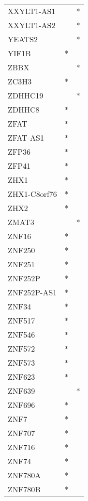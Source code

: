 \begin{longtable}{lcc}
XXYLT1-AS1       &                &          * \\
XXYLT1-AS2       &                &          * \\
YEATS2           &                &          * \\
YIF1B            &              * &            \\
ZBBX             &                &          * \\
ZC3H3            &              * &            \\
ZDHHC19          &                &          * \\
ZDHHC8           &              * &            \\
ZFAT             &              * &            \\
ZFAT-AS1         &              * &            \\
ZFP36            &              * &            \\
ZFP41            &              * &            \\
ZHX1             &              * &            \\
ZHX1-C8orf76     &              * &            \\
ZHX2             &              * &            \\
ZMAT3            &                &          * \\
ZNF16            &              * &            \\
ZNF250           &              * &            \\
ZNF251           &              * &            \\
ZNF252P          &              * &            \\
ZNF252P-AS1      &              * &            \\
ZNF34            &              * &            \\
ZNF517           &              * &            \\
ZNF546           &              * &            \\
ZNF572           &              * &            \\
ZNF573           &              * &            \\
ZNF623           &              * &            \\
ZNF639           &                &          * \\
ZNF696           &              * &            \\
ZNF7             &              * &            \\
ZNF707           &              * &            \\
ZNF716           &              * &            \\
ZNF74            &              * &            \\
ZNF780A          &              * &            \\
ZNF780B          &              * &            \\
\end{longtable}
